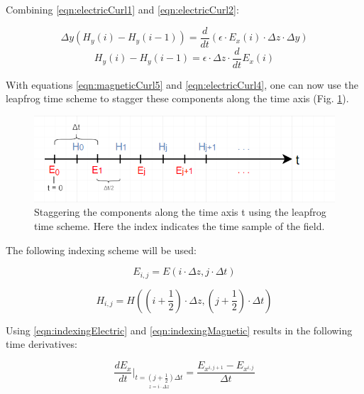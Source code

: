 Combining \ref{eqn:electricCurl1} and \ref{eqn:electricCurl2}:

\begin{equation}
	\label{eqn:electricCurl3}
	\Delta y (H_y(i) - H_y(i-1)) = \frac{d}{dt} (\epsilon \cdot E_x(i) \cdot \Delta z \cdot \Delta y)
\end{equation}
\begin{equation}
	\label{eqn:electricCurl4}
	H_y(i) - H_y(i-1) = \epsilon  \cdot \Delta z  \cdot \frac{d}{dt} E_x(i)
\end{equation}

With equations \ref{eqn:magneticCurl5} and \ref{eqn:electricCurl4}, one can now use the leapfrog time scheme to stagger these components along the time axis (Fig. \ref{fig:fdtd1dLeapfrog}).

\begin{figure}[!h]
	\centering
	\includegraphics[scale=0.75]{Figures/fdtd1dLeapfrog}
	\decoRule
	\caption[Leapfrog Time Scheme]{Staggering the components along the time axis t using the leapfrog time scheme. Here the index indicates the time sample of the field.}
	\label{fig:fdtd1dLeapfrog}
\end{figure}

The following indexing scheme will be used:

\begin{equation}
	\label{eqn:indexingElectric}
	E_{i,j} = E(i \cdot \Delta z , j \cdot \Delta t)
\end{equation}

\begin{equation}
	\label{eqn:indexingMagnetic}
	H_{i,j} = H((i + \frac{1}{2}) \cdot \Delta z , (j + \frac{1}{2}) \cdot \Delta t)
\end{equation}

Using \ref{eqn:indexingElectric} and \ref{eqn:indexingMagnetic} results in the following time derivatives:

\begin{equation}
	\label{eqn:timeDerivativeE}
	\frac{d E_x}{dt} \bigg\rvert_{\underset{z = i \cdot \Delta z}{t=(j + \frac{1}{2})\Delta t}} = \frac{E_{x^{i,j+1}} - E_{x^{i,j}}}{\Delta t}
\end{equation}

